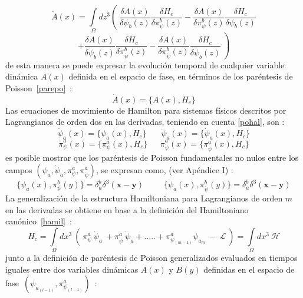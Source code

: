 \documentclass[a4paper,12pt]{article}
\begin{document}
\begin{equation}
\dot A(x)=\int\limits_{\Omega}dz^3\left(\ \frac{\delta A(x)}{\delta\psi_b(z)}\frac{\delta H_c}{\delta \pi^{b}_{\psi}(z)}-\frac{\delta A(x)}{\delta \pi^{b}_{\psi}(z) }\frac{\delta H_c}{\delta \psi_b(z)}\right. 
\end{equation}
$$\left.+\frac{\delta A(x)}{\delta \dot\psi_{b}(z)}\frac{\delta H_c}{\delta \pi^{b}_{\dot\psi}(z)}-\frac{\delta A(x)}{\delta \pi^{b}_{\dot\psi}(z) }\frac{\delta H_c}{\delta\dot\psi_b(z)}\ \right)$$
de esta manera se puede expresar la evolución temporal de cualquier variable dinámica $A(x)$ definida en el espacio de fase, en términos de los paréntesis de \mbox{Poisson \eqref{parepo} \cite{general,canoalor,tesis,hamilmodi}:}
\begin{equation}
\dot A(x)=\{A(x),H_c\}
\label{pohal}
\end{equation}
Las ecuaciones de movimiento de Hamilton para sistemas físicos descritos por Lagrangianos de  orden dos en las derivadas, teniendo en cuenta \eqref{pohal}, son \cite{general,canoalor,tesis}:
\begin{equation}
\dot\psi_a(x)=\{\psi_a(x),H_c\}\ \ \ \ \ \ \ \ \ddot\psi_a(x)=\{\dot\psi_a(x),H_c\}
\end{equation}
$$\dot\pi^{a}_{\psi}(x)=\{\pi^{a}_{\psi}(x),H_c\}\ \ \ \ \ \ \ \dot\pi^{a}_{\dot\psi}(x)=\{\pi^{a}_{\dot\psi}(x),H_c\}$$
es posible mostrar que los paréntesis de Poisson fundamentales no nulos entre los campos $(\psi_a,\dot\psi_a,\pi^{a}_{\psi},\pi^{a}_{\dot\psi})$, se expresan como, (ver Apéndice I) \cite{general,hamilton,canoalor,tesis}:
\begin{equation}
\{\psi_a(x),\pi^{b}_{\psi}(y)\}=\delta_{a}^{b}\delta^3(\textbf{x}-\textbf{y})\ \ \ \ \ \ \ \ \ \ \ \{\dot\psi_a(x),\pi^{b}_{\dot\psi}(y)\}=\delta_{a}^{b}\delta^3(\textbf{x}-\textbf{y})       
\end{equation}
La generalización de la estructura Hamiltoniana para Lagrangianos de orden $m$ en las derivadas se obtiene en base a la definición del Hamiltoniano \mbox{canónico \eqref{hamil} \cite{general,canoalor,tesis}:}
\begin{equation}
H_c=\int\limits_{\Omega}dx^{3}\ \left(\ \pi^{a}_{\psi} \ \dot\psi_a\ +\pi^{a}_{\dot\psi} \ \ddot\psi_a+.....+\pi^{a}_{\psi_{(m-1)}}\psi_{a_m}\ -\ \mathscr{L}\ \right)=\int\limits_{\Omega}dx^{3}\ \mathscr{H}  
\end{equation}
junto a la definición de paréntesis de Poisson generalizados evaluados en tiempos iguales entre dos variables dinámicas $A(x)$ y \mbox{$B(y)$} definidas en el espacio de \mbox{fase $(\psi_{a_{(l-1)}},\pi^{a}_{\psi_{(l-1)}})$ \cite{general,canoalor,tesis}:}
\end{document}
